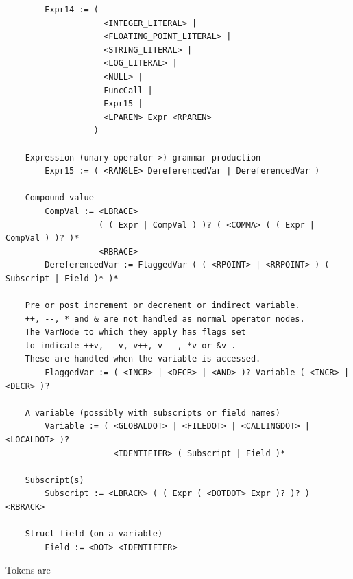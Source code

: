 \begin{verbatim}
        Expr14 := (
                    <INTEGER_LITERAL> |
                    <FLOATING_POINT_LITERAL> |
                    <STRING_LITERAL> |
                    <LOG_LITERAL> |
                    <NULL> |
                    FuncCall |
                    Expr15 |
                    <LPAREN> Expr <RPAREN>
                  )

    Expression (unary operator >) grammar production
        Expr15 := ( <RANGLE> DereferencedVar | DereferencedVar )

    Compound value
        CompVal := <LBRACE>
                   ( ( Expr | CompVal ) )? ( <COMMA> ( ( Expr | CompVal ) )? )*
                   <RBRACE>
        DereferencedVar := FlaggedVar ( ( <RPOINT> | <RRPOINT> ) ( Subscript | Field )* )*

    Pre or post increment or decrement or indirect variable.
    ++, --, * and & are not handled as normal operator nodes.
    The VarNode to which they apply has flags set
    to indicate ++v, --v, v++, v-- , *v or &v .
    These are handled when the variable is accessed.
        FlaggedVar := ( <INCR> | <DECR> | <AND> )? Variable ( <INCR> | <DECR> )?

    A variable (possibly with subscripts or field names)
        Variable := ( <GLOBALDOT> | <FILEDOT> | <CALLINGDOT> | <LOCALDOT> )?
                      <IDENTIFIER> ( Subscript | Field )*

    Subscript(s)
        Subscript := <LBRACK> ( ( Expr ( <DOTDOT> Expr )? )? ) <RBRACK>

    Struct field (on a variable)
        Field := <DOT> <IDENTIFIER>
    \end{verbatim}
    Tokens are -
